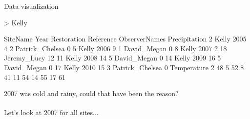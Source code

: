 \documentclass[xcolor=svgnames]{beamer}
\begin{document}
\begin{frame}[fragile]{Data visualization}
\begin{Schunk}
\begin{Sinput}
> Kelly
\end{Sinput}
\end{Schunk}
\scriptsize
\begin{Schunk}
\begin{Soutput}
   SiteName Year Restoration Reference   ObserverNames Precipitation
2     Kelly 2005           4         2 Patrick_Chelsea             0
5     Kelly 2006           9         1     David_Megan             0
8     Kelly 2007           2        18     Jeremy_Lucy            12
11    Kelly 2008          14         5     David_Megan             0
14    Kelly 2009          16         5     David_Megan             0
17    Kelly 2010          15         3 Patrick_Chelsea             0
   Temperature
2           48
5           52
8           41
11          54
14          55
17          61
\end{Soutput}
\end{Schunk}
\normalsize
\vspace{0.2in}
2007 was cold and rainy, could that have been the reason?\\~\\
Let's look at 2007 for all sites...
\end{frame}
\end{document}
